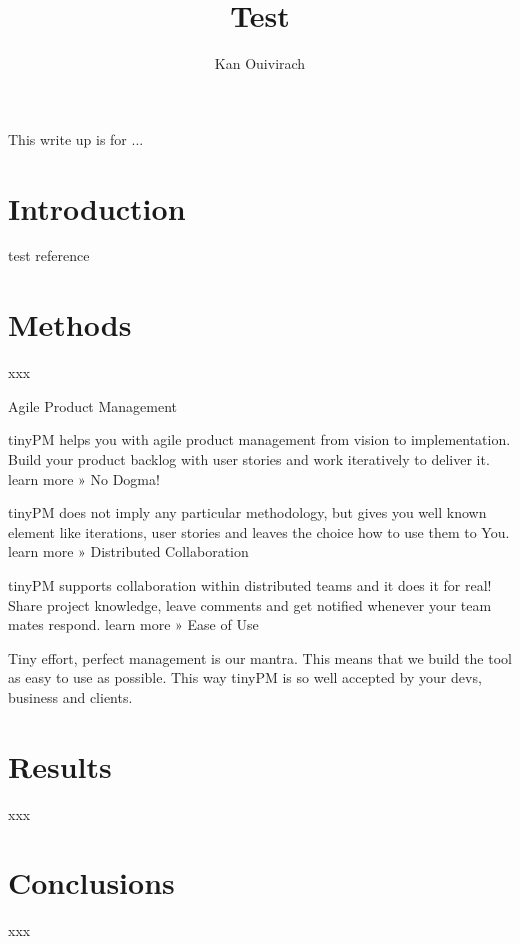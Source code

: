 \documentclass{article}
\title{Test}
\author{Kan Ouivirach}
\begin{document}


\maketitle

This write up is for ...

\section{Introduction}
\label{intro}

test reference \cite{koller}

\section{Methods}

xxx


Agile Product Management

tinyPM helps you with agile product management from vision to
implementation. Build your product backlog with user stories and work
iteratively to deliver it.  learn more » No Dogma!

tinyPM does not imply any particular methodology, but gives you well
known element like iterations, user stories and leaves the choice how
to use them to You.  learn more » Distributed Collaboration

tinyPM supports collaboration within distributed teams and it does it
for real! Share project knowledge, leave comments and get notified
whenever your team mates respond.  learn more » Ease of Use

Tiny effort, perfect management is our mantra. This means that we
build the tool as easy to use as possible. This way tinyPM is so well
accepted by your devs, business and clients.

\section{Results}

xxx

\section{Conclusions}

xxx


\end{document}
